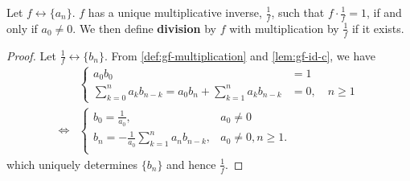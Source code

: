 \documentclass[a4paper, 12pt]{report}
\begin{document}
\begin{thm}\label{thm:gf-mult-inv}
Let $f \longleftrightarrow \{a_n\}$. $f$ has a unique multiplicative inverse, $\frac{1}{f}$, such that $f \cdot \frac{1}{f} = 1$, if and only if $a_0 \neq 0$. We then define \textbf{division} by $f$ with multiplication by $\frac{1}{f}$ if it exists.
\end{thm}
\begin{proof}
Let $\frac{1}{f} \longleftrightarrow \{b_n\}$. From \cref{def:gf-multiplication} and \cref{lem:gf-id-c}, we have
\begin{align*}
    &\begin{cases}
        a_0 b_0 &= 1\\
        \sum_{k = 0}^n a_k b_{n - k} = a_0 b_n + \sum_{k = 1}^{n} a_k b_{n - k} &= 0, \quad n \geq 1
    \end{cases}\\
    \iff &\begin{cases}
        b_0 = \frac{1}{a_0}, &a_0 \neq 0\\
        b_n = -\frac{1}{a_0} \sum_{k = 1}^{n} a_n b_{n - k}, &a_0 \neq 0, n \geq 1.\\
    \end{cases}
\end{align*}
which uniquely determines $\{b_n\}$ and hence $\frac{1}{f}$.
\end{proof}
\end{document}
